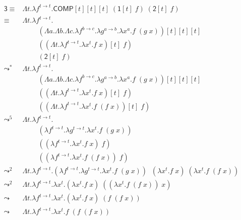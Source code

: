 \documentclass{article}
\begin{document}
\begingroup
\allowdisplaybreaks
\begin{align*}
  \mathsf{3} 
    \equiv&
      \Lambda t.
      \lambda f^{t \rightarrow t}.
        \mathsf{COMP}[t][t][t]\;
        (\mathsf{1}[t]\;f)\;
        (\mathsf{2}[t]\;f) \\
    \equiv&
      \Lambda t.
      \lambda f^{t \rightarrow t}.
        \\&\;\;\;\;\;\;\;\;(\Lambda a. \Lambda b. \Lambda c. 
        \lambda f^{b \rightarrow c}.
        \lambda g^{a \rightarrow b}.
        \lambda x^a.
          f\;(g\;x))[t][t][t]\;
        \\&\;\;\;\;\;\;\;\;((
          \Lambda t. \lambda f^{t \rightarrow t}. \lambda x^t. f\;x
          )[t]\;f)\;
        \\&\;\;\;\;\;\;\;\;(\mathsf{2}[t]\;f) \\
    \leadsto^{*}&
      \Lambda t.
      \lambda f^{t \rightarrow t}.
        \\&\;\;\;\;\;\;\;\;(\Lambda a. \Lambda b. \Lambda c. 
        \lambda f^{b \rightarrow c}.
        \lambda g^{a \rightarrow b}.
        \lambda x^a.
          f\;(g\;x))[t][t][t]\;
        \\&\;\;\;\;\;\;\;\;((
          \Lambda t. \lambda f^{t \rightarrow t}. \lambda x^t. f\;x
          )[t]\;f)\;
        \\&\;\;\;\;\;\;\;\;((
          \Lambda t. \lambda f^{t \rightarrow t}. \lambda x^t. 
            f\;(f\;x))[t]\;f) \\
    \leadsto^{5}& 
      \Lambda t.
      \lambda f^{t \rightarrow t}.
        \\&\;\;\;\;\;\;\;\;(
        \lambda f^{t \rightarrow t}.
        \lambda g^{t \rightarrow t}.
        \lambda x^t.
          f\;(g\;x))\;
        \\&\;\;\;\;\;\;\;\;((\lambda f^{t \rightarrow t}. 
          \lambda x^t. f\;x)\;f)\;
        \\&\;\;\;\;\;\;\;\;((\lambda f^{t \rightarrow t}. 
          \lambda x^t. f\;(f\;x))\;f) \\
    \leadsto^{2}& 
      \Lambda t.
      \lambda f^{t \rightarrow t}.
        (
        \lambda f^{t \rightarrow t}.
        \lambda g^{t \rightarrow t}.
        \lambda x^t.
          f\;(g\;x))\;
        \;(\lambda x^t. f\;x)
        \;(\lambda x^t. f\;(f\;x)) \\
    \leadsto^{2}& 
      \Lambda t.
      \lambda f^{t \rightarrow t}.
        \lambda x^t.
        (\lambda x^t. f\;x)\;((\lambda x^t. f\;(f\;x))\;x)
      \\
    \leadsto& 
      \Lambda t.
      \lambda f^{t \rightarrow t}.
        \lambda x^t.
        (\lambda x^t. f\;x)\;(f\;(f\;x))
      \\
    \leadsto& 
      \Lambda t.
      \lambda f^{t \rightarrow t}.
        \lambda x^t. f\;(f\;(f\;x))
      \\
\end{align*}
\endgroup
\end{document}
